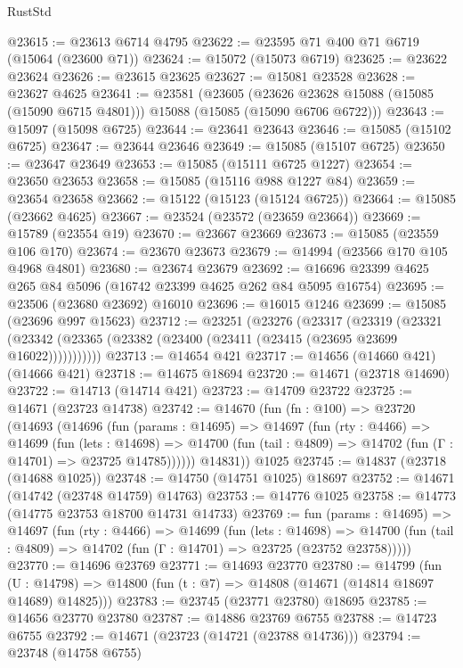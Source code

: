 \begin{lexlean}{RustStd}
\begin{coremodule}
@23615 := @23613 @6714 @4795
@23622 := @23595 @71 @400 @71 @6719 (@15064 (@23600 @71))
@23624 := @15072 (@15073 @6719)
@23625 := @23622 @23624
@23626 := @23615 @23625
@23627 := @15081 @23528
@23628 := @23627 @4625
@23641 := @23581
    (@23605
      (@23626 @23628 @15088 (@15085 (@15090 @6715 @4801)))
      @15088
      (@15085 (@15090 @6706 @6722)))
@23643 := @15097 (@15098 @6725)
@23644 := @23641 @23643
@23646 := @15085 (@15102 @6725)
@23647 := @23644 @23646
@23649 := @15085 (@15107 @6725)
@23650 := @23647 @23649
@23653 := @15085 (@15111 @6725 @1227)
@23654 := @23650 @23653
@23658 := @15085 (@15116 @988 @1227 @84)
@23659 := @23654 @23658
@23662 := @15122 (@15123 (@15124 @6725))
@23664 := @15085 (@23662 @4625)
@23667 := @23524 (@23572 (@23659 @23664))
@23669 := @15789 (@23554 @19)
@23670 := @23667 @23669
@23673 := @15085 (@23559 @106 @170)
@23674 := @23670 @23673
@23679 := @14994 (@23566 @170 @105 @4968 @4801)
@23680 := @23674 @23679
@23692 := @16696 @23399 @4625 @265 @84 @5096 (@16742 @23399 @4625 @262 @84 @5095 @16754)
@23695 := @23506 (@23680 @23692) @16010
@23696 := @16015 @1246
@23699 := @15085 (@23696 @997 @15623)
@23712 := @23251
    (@23276
      (@23317
        (@23319
          (@23321 (@23342 (@23365 (@23382 (@23400 (@23411 (@23415 (@23695 @23699 @16022)))))))))))
@23713 := @14654 @421
@23717 := @14656 (@14660 @421) (@14666 @421)
@23718 := @14675 @18694
@23720 := @14671 (@23718 @14690)
@23722 := @14713 (@14714 @421)
@23723 := @14709 @23722
@23725 := @14671 (@23723 @14738)
@23742 := @14670
    (fun (fn : @100) =>
    @23720
      (@14693
        (@14696
          (fun (params : @14695) =>
          @14697
            (fun (rty : @4466) =>
            @14699
              (fun (lets : @14698) =>
              @14700 (fun (tail : @4809) => @14702 (fun (Γ : @14701) => @23725 @14785))))))
        @14831))
    @1025
@23745 := @14837 (@23718 (@14688 @1025))
@23748 := @14750 (@14751 @1025) @18697
@23752 := @14671 (@14742 (@23748 @14759) @14763)
@23753 := @14776 @1025
@23758 := @14773 (@14775 @23753 @18700 @14731 @14733)
@23769 := fun (params : @14695) =>
  @14697
    (fun (rty : @4466) =>
    @14699
      (fun (lets : @14698) =>
      @14700 (fun (tail : @4809) => @14702 (fun (Γ : @14701) => @23725 (@23752 @23758)))))
@23770 := @14696 @23769
@23771 := @14693 @23770
@23780 := @14799
    (fun (U : @14798) => @14800 (fun (t : @7) => @14808 (@14671 (@14814 @18697 @14689) @14825)))
@23783 := @23745 (@23771 @23780) @18695
@23785 := @14656 @23770 @23780
@23787 := @14886 @23769 @6755
@23788 := @14723 @6755
@23792 := @14671 (@23723 (@14721 (@23788 @14736)))
@23794 := @23748 (@14758 @6755)

\end{coremodule}
\end{lexlean}
